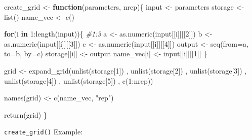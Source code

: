 \documentclass[11pt,a4paper]{article}
\newenvironment{Shaded}{\begin{snugshade}}{\end{snugshade}}
\newcommand{\AttributeTok}[1]{\textcolor[rgb]{0.77,0.63,0.00}{#1}}
\newcommand{\CommentTok}[1]{\textcolor[rgb]{0.56,0.35,0.01}{\textit{#1}}}
\newcommand{\ControlFlowTok}[1]{\textcolor[rgb]{0.13,0.29,0.53}{\textbf{#1}}}
\newcommand{\DecValTok}[1]{\textcolor[rgb]{0.00,0.00,0.81}{#1}}
\newcommand{\FunctionTok}[1]{\textcolor[rgb]{0.00,0.00,0.00}{#1}}
\newcommand{\NormalTok}[1]{#1}
\newcommand{\OtherTok}[1]{\textcolor[rgb]{0.56,0.35,0.01}{#1}}
\newcommand{\SpecialCharTok}[1]{\textcolor[rgb]{0.00,0.00,0.00}{#1}}
\newcommand{\StringTok}[1]{\textcolor[rgb]{0.31,0.60,0.02}{#1}}
\begin{document}
\begin{Shaded}
\begin{Highlighting}[]
\NormalTok{create\_grid }\OtherTok{\textless{}{-}} \ControlFlowTok{function}\NormalTok{(parameters, nrep)\{}
\NormalTok{  input }\OtherTok{\textless{}{-}}\NormalTok{ parameters}
\NormalTok{  storage }\OtherTok{\textless{}{-}} \FunctionTok{list}\NormalTok{()}
\NormalTok{  name\_vec }\OtherTok{\textless{}{-}} \FunctionTok{c}\NormalTok{()}
  
  \ControlFlowTok{for}\NormalTok{(i }\ControlFlowTok{in} \DecValTok{1}\SpecialCharTok{:}\FunctionTok{length}\NormalTok{(input))\{ }\CommentTok{\#1:3}
\NormalTok{    a }\OtherTok{\textless{}{-}} \FunctionTok{as.numeric}\NormalTok{(input[[i]][[}\DecValTok{2}\NormalTok{]])}
\NormalTok{    b }\OtherTok{\textless{}{-}} \FunctionTok{as.numeric}\NormalTok{(input[[i]][[}\DecValTok{3}\NormalTok{]])}
\NormalTok{    c }\OtherTok{\textless{}{-}} \FunctionTok{as.numeric}\NormalTok{(input[[i]][[}\DecValTok{4}\NormalTok{]])}
\NormalTok{    output }\OtherTok{\textless{}{-}} \FunctionTok{seq}\NormalTok{(}\AttributeTok{from=}\NormalTok{a, }\AttributeTok{to=}\NormalTok{b, }\AttributeTok{by=}\NormalTok{c)}
\NormalTok{    storage[[i]] }\OtherTok{\textless{}{-}}\NormalTok{  output}
\NormalTok{    name\_vec[i] }\OtherTok{\textless{}{-}}\NormalTok{ input[[i]][[}\DecValTok{1}\NormalTok{]]}
\NormalTok{  \}}
  
\NormalTok{  grid }\OtherTok{\textless{}{-}} \FunctionTok{expand\_grid}\NormalTok{(}\FunctionTok{unlist}\NormalTok{(storage[}\DecValTok{1}\NormalTok{])}
\NormalTok{                      , }\FunctionTok{unlist}\NormalTok{(storage[}\DecValTok{2}\NormalTok{])}
\NormalTok{                      , }\FunctionTok{unlist}\NormalTok{(storage[}\DecValTok{3}\NormalTok{])}
\NormalTok{                      , }\FunctionTok{unlist}\NormalTok{(storage[}\DecValTok{4}\NormalTok{])}
\NormalTok{                      , }\FunctionTok{unlist}\NormalTok{(storage[}\DecValTok{5}\NormalTok{])}
\NormalTok{                      , }\FunctionTok{c}\NormalTok{(}\DecValTok{1}\SpecialCharTok{:}\NormalTok{nrep))}
  
  \FunctionTok{names}\NormalTok{(grid) }\OtherTok{\textless{}{-}} \FunctionTok{c}\NormalTok{(name\_vec, }\StringTok{"rep"}\NormalTok{)}
  
  \FunctionTok{return}\NormalTok{(grid)}
\NormalTok{\}}
\end{Highlighting}
\end{Shaded}

\texttt{create\_grid()} Example:
\end{document}
